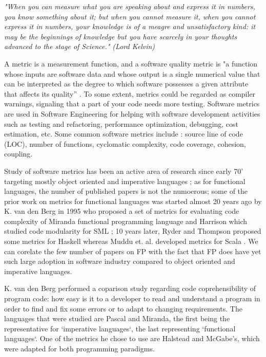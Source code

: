 \documentclass{article}
\begin{document}
\textit{"When you can measure what you are speaking about and express it in numbers, you know something about it; but when you cannot measure it, when you cannot express it in numbers, your knowledge is of a meagre and unsatisfactory kind: it may be the beginnings of knowledge but you have scarcely in your thoughts advanced to the stage of Science." (Lord Kelvin)}\par

A metric is a measurement function, and a software quality metric is "a function whose inputs are software data and whose output is a single numerical value that can be interpreted as the degree to which software possesses a given attribute that affects its quality'' \cite{Kaner04softwareengineering}. To some extent, metrics could be regarded as compiler warnings, signaling that a part of your code needs more testing. Software metrics are used in Software Engineering for helping with software development activities such as testing and refactoring, performance optimization, debugging, cost estimation, etc. Some common software metrics include : source line of code (LOC), number of functions, cyclomatic complexity, code coverage, cohesion, coupling. \par

Study of software metrics has been an active area of research since early 70' targeting mostly object oriented and imperative languages \cite{RyderT05:TFP_2005_Intellect}; as for functional languages, the number of published papers is not the numoerous; some of the prior work on metrics for functional languages was started almost 20 years ago by K. van den Berg in 1995 \cite{DBLP:journals/infsof/BergB95} who proposed a set of metrics for evaluating code complexity of Miranda functional programming language and Harrison which studied code modularity for SML \cite{eps250597}; 10 years later, Ryder and Thompson proposed some metrics for Haskell \cite{RyderT05:TFP_2005_Intellect} whereas  Muddu et. al. developed metrics for Scala \cite{DBLP:conf/icse/MudduABP13}. We can corelate the few number of papers on FP with the fact that FP does have yet such large adoption in software industry compared to object oriented and imperative languages.  \par

K. van den Berg performed a coparison study regarding code coprehensibility of program code: how easy is it to a developer to read and understand a program in order to find and fix some errors or to adapt to changing requirements. The languages that were studied are Pascal and Miranda, the first being the representative for `imperative languages`, the last representing `functional languages`. One of the metrics he chose to use are Halstead and McGabe's, which were adapted for both programming paradigms. \par
\end{document}
